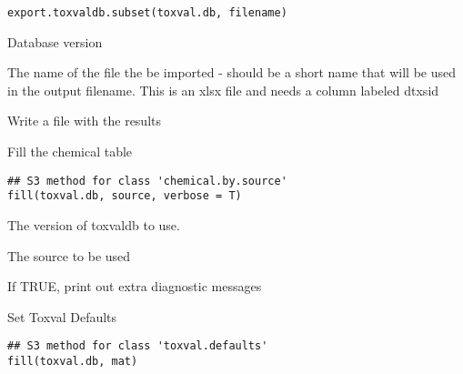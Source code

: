 \documentclass[letterpaper]{book}
\begin{document}
%
\begin{Usage}
\begin{verbatim}
export.toxvaldb.subset(toxval.db, filename)
\end{verbatim}
\end{Usage}
%
\begin{Arguments}
\begin{ldescription}
\item[\code{toxval.db}] Database version

\item[\code{filename}] The name of the file the be imported - should be a short name that
will be used in the output filename. This is an xlsx file and needs a column labeled dtxsid
\end{ldescription}
\end{Arguments}
%
\begin{Value}
Write a file with the results
\end{Value}
%
\begin{Description}\relax
Fill the chemical table
\end{Description}
%
\begin{Usage}
\begin{verbatim}
## S3 method for class 'chemical.by.source'
fill(toxval.db, source, verbose = T)
\end{verbatim}
\end{Usage}
%
\begin{Arguments}
\begin{ldescription}
\item[\code{toxval.db}] The version of toxvaldb to use.

\item[\code{source}] The source to be used

\item[\code{verbose}] If TRUE, print out extra diagnostic messages
\end{ldescription}
\end{Arguments}
%
\begin{Description}\relax
Set Toxval Defaults
\end{Description}
%
\begin{Usage}
\begin{verbatim}
## S3 method for class 'toxval.defaults'
fill(toxval.db, mat)
\end{verbatim}
\end{Usage}
\end{document}
